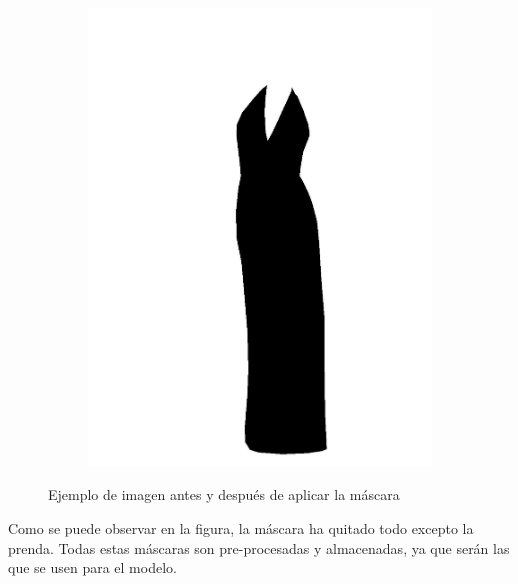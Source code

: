 \documentclass[12pt]{report} %
\begin{document}
\begin{figure}[H]
\begin{subfigure}{0.45\textwidth}
			\includegraphics[width=\linewidth]{ejemplo-con-mascara.jpg}
		\end{subfigure}
		\caption{Ejemplo de imagen antes y después de aplicar la máscara}
	\end{figure}

	Como se puede observar en la figura, la máscara ha quitado todo excepto la prenda.
	Todas estas máscaras son pre-procesadas y almacenadas, ya que serán las que se usen para el modelo.
\end{document}
